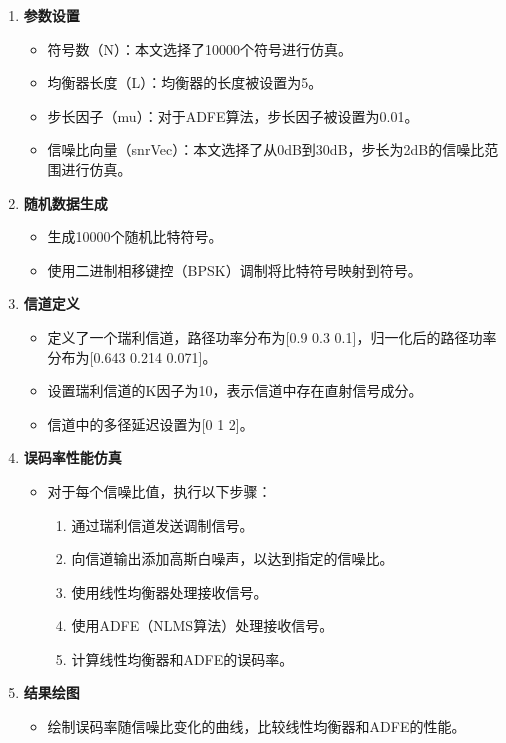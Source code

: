 \documentclass[UTF8,a4paper,12pt]{ctexart}
\numberwithin{equation}{section}
\begin{document}
\begin{enumerate}
	\item \textbf{参数设置}
	\begin{itemize}
		\item 符号数（N）：本文选择了10000个符号进行仿真。
		\item 均衡器长度（L）：均衡器的长度被设置为5。
		\item 步长因子（mu）：对于ADFE算法，步长因子被设置为0.01。
		\item 信噪比向量（snrVec）：本文选择了从0dB到30dB，步长为2dB的信噪比范围进行仿真。
	\end{itemize}
	
	\item \textbf{随机数据生成}
	\begin{itemize}
		\item 生成10000个随机比特符号。
		\item 使用二进制相移键控（BPSK）调制将比特符号映射到符号。
	\end{itemize}
	
	\item \textbf{信道定义}
	\begin{itemize}
		\item 定义了一个瑞利信道，路径功率分布为[0.9 0.3 0.1]，归一化后的路径功率分布为[0.643 0.214 0.071]。
		\item 设置瑞利信道的K因子为10，表示信道中存在直射信号成分。
		\item 信道中的多径延迟设置为[0 1 2]。
	\end{itemize}
	
	\item \textbf{误码率性能仿真}
	\begin{itemize}
		\item 对于每个信噪比值，执行以下步骤：
		\begin{enumerate}
			\item 通过瑞利信道发送调制信号。
			\item 向信道输出添加高斯白噪声，以达到指定的信噪比。
			\item 使用线性均衡器处理接收信号。
			\item 使用ADFE（NLMS算法）处理接收信号。
			\item 计算线性均衡器和ADFE的误码率。
		\end{enumerate}
	\end{itemize}
	
	\item \textbf{结果绘图}
	\begin{itemize}
		\item 绘制误码率随信噪比变化的曲线，比较线性均衡器和ADFE的性能。
	\end{itemize}
	

\end{enumerate}
\end{document}
